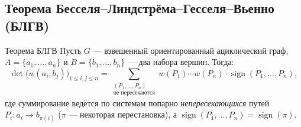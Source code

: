 \subsection{Теорема Бесселя--Линдстрёма--Гесселя--Вьенно (БЛГВ)}

\begin{Theorem}{Теорема БЛГВ}{}
	Пусть $G$ — взвешенный ориентированный ациклический граф,
	$A = \{a_1, \ldots, a_n\}$ и $B = \{b_1, \ldots, b_n\}$ — два набора вершин. Тогда:
	\[
	\det\!\bigl(w(a_i, b_j)\bigr)_{1\le i,j\le n}
	=
	\sum_{\substack{(P_1,\ldots,P_n) \\ \text{не пересекаются}}}
	w(P_1)\cdots w(P_n)\cdot\operatorname{sign}(P_1,\ldots,P_n),
	\]
	где суммирование ведётся по системам попарно \emph{непересекающихся} путей
	$P_i : a_i \to b_{\pi(i)}$
	($\pi$ — некоторая перестановка), а
	$\operatorname{sign}(P_1,\ldots,P_n) = \operatorname{sign}(\pi)$.
\end{Theorem}

